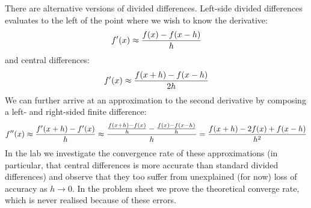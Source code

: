 There are alternative versions of divided differences. Left-side divided differences evaluates to the left of the point where we wish to know the derivative:
\[
f'(x) \ensuremath{\approx} {f(x) - f(x-h) \over h}
\]
and central differences:
\[
f'(x) \ensuremath{\approx} {f(x + h) - f(x - h) \over 2h}
\]
We can further arrive at an approximation to the second derivative by composing a left- and right-sided finite difference:
\[
f''(x) \ensuremath{\approx} {f'(x+h) - f'(x) \over h} \ensuremath{\approx} {{f(x+h) - f(x) \over h} - {f(x) - f(x-h) \over h} \over h}
= {f(x+h) - 2f(x)  + f(x-h) \over h^2}
\]
In the lab we investigate the convergence rate of these approximations (in particular, that  central differences is more accurate than standard divided differences) and observe that they too suffer from unexplained (for now) loss of accuracy as $h \ensuremath{\rightarrow} 0$. In the problem sheet we prove the theoretical converge rate, which is never realised because of these errors.



